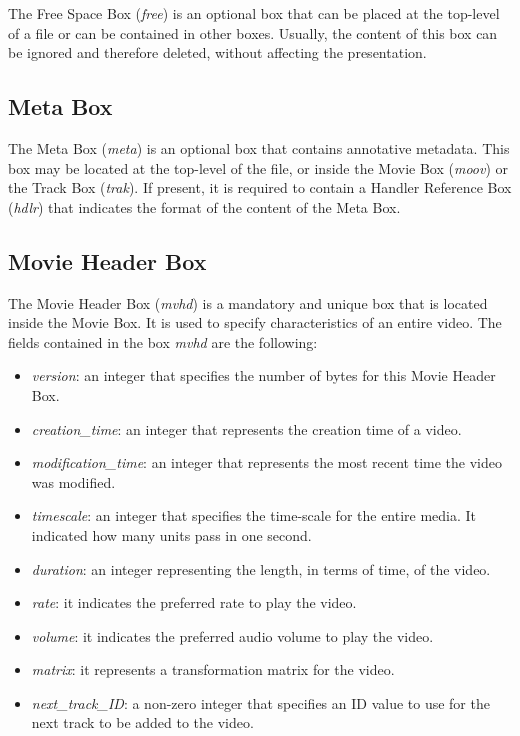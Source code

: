 The Free Space Box (\emph{free}) is an optional box that can be placed at the top-level of a file or can be contained in other boxes. Usually, the content of this box can be ignored and therefore deleted, without affecting the presentation.

\subsection*{Meta Box}

The Meta Box (\emph{meta}) is an optional box that contains annotative metadata. This box may be located at the top-level of the file, or inside the Movie Box (\emph{moov}) or the Track Box (\emph{trak}). If present, it is required to contain a Handler Reference Box (\emph{hdlr}) that indicates the format of the content of the Meta Box.

\subsection*{Movie Header Box}

The Movie Header Box (\emph{mvhd}) is a mandatory and unique box that is located inside the Movie Box. It is used to specify characteristics of an entire video. The fields contained in the box \emph{mvhd} are the following:

\begin{itemize}
\item \emph{version}: an integer that specifies the number of bytes for this Movie Header Box.
\item \emph{creation\_time}: an integer that represents the creation time of a video.
\item \emph{modification\_time}: an integer that represents the most recent time the video was modified.
\item \emph{timescale}: an integer that specifies the time-scale for the entire media. It indicated how many units pass in one second.
\item \emph{duration}: an integer representing the length, in terms of time, of the video.
\item \emph{rate}: it indicates the preferred rate to play the video.
\item \emph{volume}: it indicates the preferred audio volume to play the video.
\item \emph{matrix}: it represents a transformation matrix for the video.
\item \emph{next\_track\_ID}: a non-zero integer that specifies an ID value to use for the next track to be added to the video.
\end{itemize}

